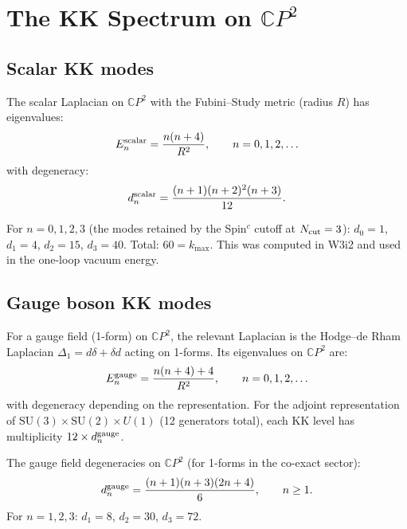 \documentclass[11pt,a4paper]{article}
\newcommand{\CP}{\mathbb{C}P}
\begin{document}
\section{The KK Spectrum on $\CP^2$}
\label{sec:KK-spectrum}

\subsection{Scalar KK modes}

The scalar Laplacian on $\CP^2$ with the Fubini--Study metric
(radius $R$) has eigenvalues:
\begin{equation}
E_n^{\rm scalar} = \frac{n(n+4)}{R^2}, \qquad n = 0, 1, 2, \ldots
\label{eq:scalar-eigenvalues}
\end{equation}
with degeneracy:
\begin{equation}
d_n^{\rm scalar} = \frac{(n+1)(n+2)^2(n+3)}{12}.
\end{equation}

For $n = 0,1,2,3$ (the modes retained by the Spin$^c$ cutoff at
$N_{\rm cut} = 3$): $d_0 = 1$, $d_1 = 4$, $d_2 = 15$, $d_3 = 40$.
Total: $60 = k_{\max}$. This was computed in W3i2 and used in the
one-loop vacuum energy.

\subsection{Gauge boson KK modes}

For a gauge field (1-form) on $\CP^2$, the relevant Laplacian is
the Hodge--de Rham Laplacian $\Delta_1 = d\delta + \delta d$
acting on 1-forms. Its eigenvalues on $\CP^2$ are:
\begin{equation}
E_n^{\rm gauge} = \frac{n(n+4) + 4}{R^2}, \qquad n = 0, 1, 2, \ldots
\label{eq:gauge-eigenvalues}
\end{equation}
with degeneracy depending on the representation. For the adjoint
representation of $\mathrm{SU}(3) \times \mathrm{SU}(2) \times U(1)$
(12 generators total), each KK level has multiplicity
$12 \times d_n^{\rm gauge}$.

The gauge field degeneracies on $\CP^2$ (for 1-forms in the
co-exact sector):
\begin{equation}
d_n^{\rm gauge} = \frac{(n+1)(n+3)(2n+4)}{6}, \qquad n \geq 1.
\end{equation}
For $n = 1,2,3$: $d_1 = 8$, $d_2 = 30$, $d_3 = 72$.
\end{document}
